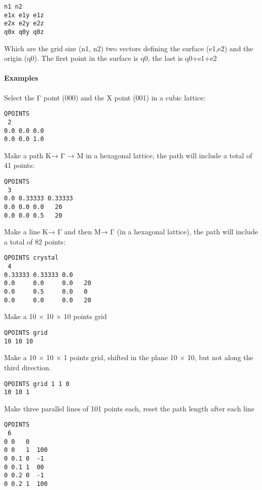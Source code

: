 \documentclass[
]{article}
\begin{document}
\begin{verbatim}
n1 n2
e1x e1y e1z
e2x e2y e2z
q0x q0y q0z
\end{verbatim}

Which are the grid size (n1, n2) two vectors defining the surface
(e1,e2) and the origin (q0). The first point in the surface is q0, the
last is q0+e1+e2

\hypertarget{examples}{%
\paragraph{Examples}\label{examples}}

Select the Γ point (000) and the X point (001) in a cubic lattice:

\begin{verbatim}
QPOINTS
 2
0.0 0.0 0.0
0.0 0.0 1.0 
\end{verbatim}

Make a path K→ Γ → M in a hexagonal lattice, the path will include a
total of 41 points:

\begin{verbatim}
QPOINTS
 3
0.0 0.33333 0.33333
0.0 0.0 0.0   20
0.0 0.0 0.5   20
\end{verbatim}

Make a line K→ Γ and then M→ Γ (in a hexagonal lattice), the path will
include a total of 82 points:

\begin{verbatim}
QPOINTS crystal
 4
0.33333 0.33333 0.0
0.0     0.0     0.0   20
0.0     0.5     0.0   0
0.0     0.0     0.0   20
\end{verbatim}

Make a 10 × 10 × 10 points grid

\begin{verbatim}
QPOINTS grid
10 10 10
\end{verbatim}

Make a 10 × 10 × 1 points grid, shifted in the plane 10 × 10, but not
along the third direction.

\begin{verbatim}
QPOINTS grid 1 1 0
10 10 1
\end{verbatim}

Make three parallel lines of 101 points each, reset the path length
after each line

\begin{verbatim}
QPOINTS
 6
0 0   0
0 0   1  100
0 0.1 0  -1
0 0.1 1  00
0 0.2 0  -1
0 0.2 1  100
\end{verbatim}
\end{document}
